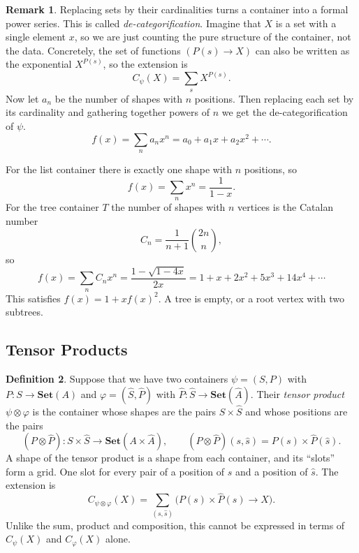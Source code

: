 \documentclass[11pt, a4paper]{article}
\theoremstyle{definition}
\newtheorem{definition}{Definition}[section]
\newtheorem{remark}[definition]{Remark}
\theoremstyle{plain}
\begin{document}
\begin{remark}\label{rem:decategorification}
Replacing sets by their cardinalities turns a container into a formal
power series.  This is called \emph{de-categorification}.
Imagine that $X$ is a set with a single element $x$, so we are just
counting the pure structure of the container, not the data.
Concretely, the set of functions $(P(s) \to X)$ can also be written as
the exponential $X^{P(s)}$, so the extension is
\[
  C_\psi(X) = \sum_{s} X^{P(s)}.
\]
Now let $a_n$ be the number of shapes with $n$ positions.  Then
replacing each set by its cardinality and gathering together powers of
$n$ we get the de-categorification of $\psi$.
\[
  f(x) = \sum_n a_n x^n = a_0 + a_1 x + a_2 x^2 + \cdots.
\]

For the list container there is exactly one shape with $n$ positions, so
\[
  f(x) = \sum_n x^n = \frac{1}{1 - x}.
\]
For the tree container $T$ the number
of shapes with $n$ vertices is the Catalan number
\[
  C_n = \frac{1}{n+1}\binom{2n}{n},
\]
so
\[
  f(x) = \sum_n C_n x^n = \frac{1 - \sqrt{1 - 4x}}{2x}
       = 1 + x + 2x^2 + 5x^3 + 14x^4 + \cdots
\]
This satisfies $f(x) = 1 + x f(x)^2$.  A tree is empty, or a root vertex
with two subtrees.
\end{remark}

\subsection{Tensor Products}

\noindent\colorbox{gray!15}{\parbox{\dimexpr\linewidth-2\fboxsep}{%
\begin{definition}\label{def:tensor}
Suppose that we have two containers $\psi = (S, P)$ with
$P : S \to \mathbf{Set}(A)$ and $\varphi = (\hat{S}, \hat{P})$ with
$\hat{P} : \hat{S} \to \mathbf{Set}(\hat{A})$.  Their \emph{tensor
product} $\psi \otimes \varphi$ is the container whose shapes are the
pairs $S \times \hat{S}$ and whose positions are the pairs
\[
  (P \otimes \hat{P}) : S \times \hat{S} \to
  \mathbf{Set}(A \times \hat{A}), \qquad
  (P \otimes \hat{P})(s, \hat{s}) = P(s) \times \hat{P}(\hat{s}).
\]
A shape of the tensor product is a shape from each container, and its
``slots'' form a grid.  One slot for every pair of a position of $s$ and a
position of $\hat{s}$.  The extension is
\[
  C_{\psi \otimes \varphi}(X) = \sum_{(s, \hat{s})}
  \bigl(P(s) \times \hat{P}(\hat{s}) \to X\bigr).
\]
Unlike the sum, product and composition, this cannot be expressed in
terms of $C_\psi(X)$ and $C_{\varphi}(X)$ alone.
\end{definition}%
}}
\end{document}
